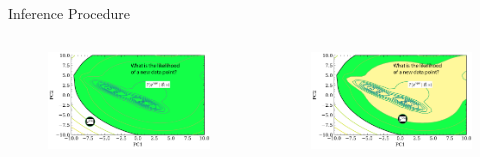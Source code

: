 \documentclass[t]{beamer}
\theoremstyle{definition}
\begin{document}
\begin{frame}{Inference Procedure}

    \begin{columns}[T] %
    
    \begin{column}{0.5\textwidth} %
    
        \begin{figure}
        \includegraphics[width=\textwidth]{figs/de_pc1_pc2_likelihood_likelihood_small_threshold_answer_outside.pdf}
    \end{figure}

    \end{column}
    \begin{column}{0.5\textwidth} %
        \begin{figure}
            \includegraphics[width=\textwidth]{figs/de_pc1_pc2_likelihood_likelihood_small_threshold_answer_inside.pdf}
        \end{figure}
    \end{column}


\end{columns}
\end{frame}
\end{document}
